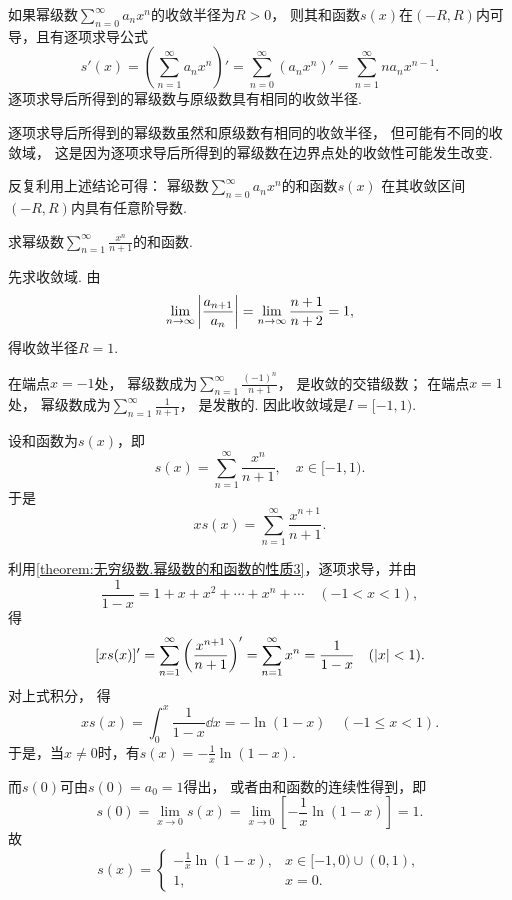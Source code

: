 \begin{property}\label{theorem:无穷级数.幂级数的和函数的性质3}
如果幂级数\(\sum\limits_{n=0}^\infty a_n x^n\)的收敛半径为\(R>0\)，
则其和函数\(s(x)\)在\((-R,R)\)内可导，且有逐项求导公式\[
	s'(x)
	= \left( \sum\limits_{n=1}^\infty a_n x^n \right)'
	= \sum\limits_{n=0}^\infty (a_n x^n)'
	= \sum\limits_{n=1}^\infty n a_n x^{n-1}.
\]
逐项求导后所得到的幂级数与原级数具有相同的收敛半径.
\end{property}
逐项求导后所得到的幂级数虽然和原级数有相同的收敛半径，
但可能有不同的收敛域，
这是因为逐项求导后所得到的幂级数在边界点处的收敛性可能发生改变.

反复利用上述结论可得：
幂级数\(\sum\limits_{n=0}^\infty a_n x^n\)的和函数\(s(x)\)
在其收敛区间\((-R,R)\)内具有任意阶导数.

\begin{example}
求幂级数\(\sum\limits_{n=1}^\infty \frac{x^n}{n+1}\)的和函数.
\begin{solution}
先求收敛域.
由\[
	\lim\limits_{n\to\infty} \abs{\frac{a_{n+1}}{a_n}}
	= \lim\limits_{n\to\infty} \frac{n+1}{n+2}
	= 1,
\]
得收敛半径\(R=1\).

在端点\(x = -1\)处，
幂级数成为\(\sum\limits_{n=1}^\infty \frac{(-1)^n}{n+1}\)，
是收敛的交错级数；
在端点\(x = 1\)处，
幂级数成为\(\sum\limits_{n=1}^\infty \frac{1}{n+1}\)，
是发散的.
因此收敛域是\(I = [-1,1)\).

设和函数为\(s(x)\)，即\[
	s(x) = \sum\limits_{n=1}^\infty \frac{x^n}{n+1},
	\quad x\in[-1,1).
\]
于是\[
	x s(x) = \sum\limits_{n=1}^\infty \frac{x^{n+1}}{n+1}.
\]

利用\cref{theorem:无穷级数.幂级数的和函数的性质3}，逐项求导，并由\[
	\frac{1}{1-x} = 1+x+x^2+\dotsb+x^n+\dotsb
	\quad(-1<x<1),
\]
得\[
	[x s(x)]'
	= \sum\limits_{n=1}^\infty \left( \frac{x^{n+1}}{n+1} \right)'
	= \sum\limits_{n=1}^\infty x^n
	= \frac{1}{1-x}
	\quad(\abs{x}<1).
\]
对上式积分，
得\[
	x s(x) = \int_0^x \frac{1}{1-x} \dd{x} = -\ln(1-x)
	\quad(-1 \leq x < 1).
\]
于是，当\(x\neq0\)时，有\(s(x) = -\frac{1}{x} \ln(1-x)\).

而\(s(0)\)可由\(s(0) = a_0 = 1\)得出，
或者由和函数的连续性得到，即\[
	s(0)
	= \lim\limits_{x\to0} s(x)
	= \lim\limits_{x\to0} \left[ -\frac{1}{x} \ln(1-x) \right]
	= 1.
\]
故\[
	s(x) = \left\{ \begin{array}{cl}
		-\frac{1}{x} \ln(1-x), & x\in[-1,0)\cup(0,1), \\
		1, & x=0.
	\end{array} \right.
\]
\end{solution}
\end{example}
